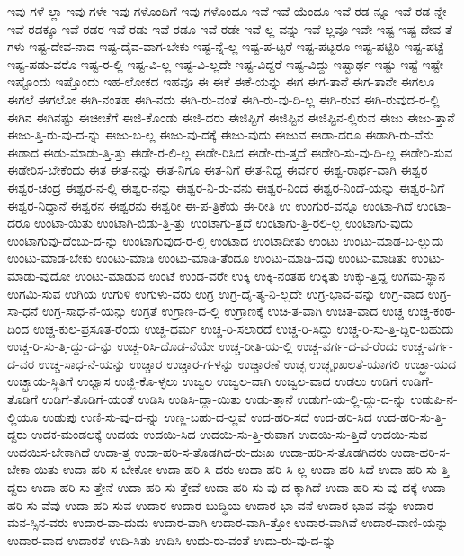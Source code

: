 {ಇವು-ಗಳೆ-ಲ್ಲಾ
ಇವು-ಗಳೇ
ಇವು-ಗಳೊಂದಿಗೆ
ಇವು-ಗಳೊಂದೂ
ಇವೆ
ಇವೆ-ಯೆಂದೂ
ಇವೆ-ರಡ-ನ್ನೂ
ಇವೆ-ರಡ-ನ್ನೇ
ಇವೆ-ರಡಕ್ಕೂ
ಇವೆ-ರಡರ
ಇವೆ-ರಡು
ಇವೆ-ರಡೂ
ಇವೆ-ರಡೇ
ಇವೆ-ಲ್ಲ-ವನ್ನು
ಇವೆ-ಲ್ಲವೂ
ಇವೇ
ಇಷ್ಟ
ಇಷ್ಟ-ದೇವ-ತೆ-ಗಳು
ಇಷ್ಟ-ದೇವ-ನಾದ
ಇಷ್ಟ-ದೈವ-ವಾಗ-ಬೇಕು
ಇಷ್ಟ-ನ್ನೆ-ಲ್ಲ
ಇಷ್ಟ-ಪ-ಟ್ಟರೆ
ಇಷ್ಟ-ಪಟ್ಟರೂ
ಇಷ್ಟ-ಪಟ್ಟಿರಿ
ಇಷ್ಟ-ಪಟ್ಟೆ
ಇಷ್ಟ-ಪಡು-ವರೊ
ಇಷ್ಟ-ರ-ಲ್ಲಿ
ಇಷ್ಟ-ವಿ-ಲ್ಲ
ಇಷ್ಟ-ವಿ-ಲ್ಲದೇ
ಇಷ್ಟ-ವಿದ್ದರೆ
ಇಷ್ಟ-ವಿದ್ದು
ಇಷ್ಟಾರ್ಥ
ಇಷ್ಟು
ಇಷ್ಟೆ
ಇಷ್ಟೇ
ಇಷ್ಟೊಂದು
ಇಷ್ತೊಂದು
ಇಹ-ಲೋಕದ
ಇಹವೂ
ಈ
ಈಕೆ
ಈಕೆ-ಯನ್ನು
ಈಗ
ಈಗ-ತಾನೆ
ಈಗ-ತಾನೇ
ಈಗಲೂ
ಈಗಲೆ
ಈಗಲೋ
ಈಗಿ-ನಂತಹ
ಈಗಿ-ನದು
ಈಗಿ-ರು-ವಂತೆ
ಈಗಿ-ರು-ವು-ದಿ-ಲ್ಲ
ಈಗಿ-ರುವ
ಈಗಿ-ರುವುದ-ರ-ಲ್ಲಿ
ಈಗಿನ
ಈಗಿನಷ್ಟು
ಈಚೀಚೆಗೆ
ಈಜಿ-ಕೊಂಡು
ಈಜಿ-ದರು
ಈಜಿಪ್ಟಿಗೆ
ಈಜಿಪ್ಟಿನ
ಈಜಿಪ್ಟಿನ-ಲ್ಲಿರುವ
ಈಜು
ಈಜು-ತ್ತಾನೆ
ಈಜು-ತ್ತಿ-ರು-ವು-ದ-ನ್ನು
ಈಜು-ಬ-ಲ್ಲ
ಈಜು-ವು-ದಕ್ಕೆ
ಈಜು-ವುದು
ಈಜುವ
ಈಡಾ-ದರೂ
ಈಡಾಗಿ-ರು-ವೆನು
ಈಡಾದ
ಈಡು-ಮಾಡು-ತ್ತಿ-ತ್ತು
ಈಡೇ-ರ-ಲಿ-ಲ್ಲ
ಈಡೇ-ರಿಸಿದ
ಈಡೇ-ರು-ತ್ತದೆ
ಈಡೇರಿ-ಸು-ವು-ದಿ-ಲ್ಲ
ಈಡೇರಿ-ಸುವ
ಈಡೇರಿಸ-ಬೇಕೆಂದು
ಈತ
ಈತ-ನನ್ನು
ಈತ-ನಿಗೂ
ಈತ-ನಿಗೆ
ಈತ-ನಿದ್ದ
ಈರ್ವರ
ಈಶ್ವ-ರಾರ್ಥ-ವಾಗಿ
ಈಶ್ವರ
ಈಶ್ವರ-ಚಂದ್ರ
ಈಶ್ವರ-ನ-ಲ್ಲಿ
ಈಶ್ವರ-ನನ್ನು
ಈಶ್ವರ-ನಿ-ರು-ವನು
ಈಶ್ವರ-ನಿಂದೆ
ಈಶ್ವರ-ನಿಂದೆ-ಯನ್ನು
ಈಶ್ವರ-ನಿಗೆ
ಈಶ್ವರ-ನಿದ್ದಾನೆ
ಈಶ್ವರನ
ಈಶ್ವರನು
ಈಶ್ವರೀ
ಈ-ಪ-ತ್ರಿಕೆಯ
ಈ-ರೀತಿ
ಉ
ಉಂಗುರ-ವನ್ನೂ
ಉಂಟಾ-ಗಿದೆ
ಉಂಟಾ-ದರೂ
ಉಂಟಾ-ಯಿತು
ಉಂಟಾಗಿ-ಬಿಡು-ತ್ತಿ-ತ್ತು
ಉಂಟಾಗು-ತ್ತದೆ
ಉಂಟಾಗು-ತ್ತಿ-ರಲಿ-ಲ್ಲ
ಉಂಟಾಗು-ವುದು
ಉಂಟಾಗುವು-ದೆಂಬು-ದ-ನ್ನು
ಉಂಟಾಗುವುದ-ರ-ಲ್ಲಿ
ಉಂಟಾದ
ಉಂಟಾದೀತು
ಉಂಟು
ಉಂಟು-ಮಾಡ-ಬ-ಲ್ಲುದು
ಉಂಟು-ಮಾಡ-ಬೇಕು
ಉಂಟು-ಮಾಡಿ
ಉಂಟು-ಮಾಡಿ-ತೆಂದೂ
ಉಂಟು-ಮಾಡಿ-ದವು
ಉಂಟು-ಮಾಡಿತು
ಉಂಟು-ಮಾಡು-ವುದೋ
ಉಂಟು-ಮಾಡುವ
ಉಂಟೆ
ಉಂಡ-ವರೇ
ಉಕ್ಕಿ
ಉಕ್ಕಿ-ನಂತಹ
ಉಕ್ಕಿತು
ಉಕ್ಕು-ತ್ತಿದ್ದ
ಉಗಮ-ಸ್ಥಾನ
ಉಗಮಿ-ಸುವ
ಉಗಿಯ
ಉಗುಳಿ
ಉಗುಳು-ವರು
ಉಗ್ರ
ಉಗ್ರ-ದೈ-ತ್ಯ-ನಿ-ಲ್ಲದೇ
ಉಗ್ರ-ಭಾವ-ವನ್ನು
ಉಗ್ರ-ವಾದ
ಉಗ್ರ-ಸಾ-ಧನೆ
ಉಗ್ರ-ಸಾಧ-ನೆ-ಯನ್ನು
ಉಗ್ರತೆ
ಉಗ್ರಾಣ-ದ-ಲ್ಲಿ
ಉಗ್ರಾಣಕ್ಕೆ
ಉಚಿ-ತ-ವಾಗಿ
ಉಚಿತ-ವಾದ
ಉಚ್ಚ
ಉಚ್ಚ-ಕಂಠ-ದಿಂದ
ಉಚ್ಚ-ಕುಲ-ಪ್ರಸೂತ-ರೆಂದು
ಉಚ್ಚ-ಧರ್ಮ
ಉಚ್ಚ-ರಿ-ಸಲಾರದೆ
ಉಚ್ಚ-ರಿ-ಸಿದ್ದು
ಉಚ್ಚ-ರಿ-ಸು-ತ್ತಿ-ದ್ದಿರ-ಬಹುದು
ಉಚ್ಚ-ರಿ-ಸು-ತ್ತಿ-ದ್ದು-ದ-ನ್ನು
ಉಚ್ಚ-ರಿಸಿ-ದೊಡ-ನೆಯೇ
ಉಚ್ಚ-ರೀತಿ-ಯ-ಲ್ಲಿ
ಉಚ್ಚ-ವರ್ಗ-ದ-ವ-ರೆಂದು
ಉಚ್ಚ-ವರ್ಗ-ದ-ವರ
ಉಚ್ಚ-ಸಾಧ-ನೆ-ಯನ್ನು
ಉಚ್ಚಾರ
ಉಚ್ಚಾರ-ಗ-ಳನ್ನು
ಉಚ್ಚಾರಣೆ
ಉಚ್ಛ
ಉಚ್ಛೃಂಖಲತೆ-ಯಾಗಲಿ
ಉಚ್ಛ್ರಾ-ಯದ
ಉಚ್ಛ್ರಾಯ-ಸ್ಥಿತಿಗೆ
ಉಛ್ವಾಸ
ಉಜ್ಜಿ-ಕೊ-ಳ್ಳಲು
ಉಜ್ವಲ
ಉಜ್ವಲ-ವಾಗಿ
ಉಜ್ವಲ-ವಾದ
ಉಡಲು
ಉಡಿಗೆ
ಉಡಿಗೆ-ತೊಡಿಗೆ
ಉಡಿಗೆ-ತೊಡಿಗೆ-ಯಂತೆ
ಉಡಿಸಿ
ಉಡಿಸಿ-ದ್ದಾ-ಯಿತು
ಉಡು-ತ್ತಾನೆ
ಉಡುಗೆ-ಯ-ಲ್ಲಿ-ದ್ದು-ದ-ನ್ನು
ಉಡುಪಿ-ನ-ಲ್ಲಿಯೂ
ಉಡುಪು
ಉಣಿ-ಸು-ವು-ದ-ನ್ನು
ಉಣ್ಣ-ಬಹು-ದ-ಲ್ಲವೆ
ಉದ-ಹರಿ-ಸದೆ
ಉದ-ಹರಿ-ಸಿದ
ಉದ-ಹರಿ-ಸು-ತ್ತಿ-ದ್ದರು
ಉದಕ-ಮಂಡಲಕ್ಕೆ
ಉದಯ
ಉದಯಿ-ಸಿದ
ಉದಯಿ-ಸು-ತ್ತಿ-ರುವಾಗ
ಉದಯಿ-ಸು-ತ್ತಿದೆ
ಉದಯಿ-ಸುವ
ಉದಯಿಸ-ಬೇಕಾಗಿದೆ
ಉದಾ-ತ್ತ
ಉದಾ-ಹರಿ-ಸ-ತೊಡಗಿದ-ರು-ದುಃಖ
ಉದಾ-ಹರಿ-ಸ-ತೊಡಗಿದರು
ಉದಾ-ಹರಿ-ಸ-ಬೇಕಾ-ಯಿತು
ಉದಾ-ಹರಿ-ಸ-ಬೇಕೋ
ಉದಾ-ಹರಿ-ಸಿ-ದರು
ಉದಾ-ಹರಿ-ಸಿ-ಲ್ಲ
ಉದಾ-ಹರಿ-ಸಿದೆ
ಉದಾ-ಹರಿ-ಸು-ತ್ತಿ-ದ್ದರು
ಉದಾ-ಹರಿ-ಸು-ತ್ತೇನೆ
ಉದಾ-ಹರಿ-ಸು-ತ್ತೇವೆ
ಉದಾ-ಹರಿ-ಸು-ವು-ದ-ಕ್ಕಾಗಿದೆ
ಉದಾ-ಹರಿ-ಸು-ವು-ದಕ್ಕೆ
ಉದಾ-ಹರಿ-ಸು-ವೆವು
ಉದಾ-ಹರಿ-ಸುವ
ಉದಾರ
ಉದಾರ-ಬುದ್ಧಿಯ
ಉದಾರ-ಭಾ-ವನೆ
ಉದಾರ-ಭಾವ-ವನ್ನು
ಉದಾರ-ಮನ-ಸ್ಸಿನ-ವರು
ಉದಾರ-ವಾ-ದುದು
ಉದಾರ-ವಾಗಿ
ಉದಾರ-ವಾಗಿ-ತ್ತೋ
ಉದಾರ-ವಾಗಿವೆ
ಉದಾರ-ವಾಣಿ-ಯನ್ನು
ಉದಾರ-ವಾದ
ಉದಾರತೆ
ಉದಿ-ಸಿತು
ಉದಿಸಿ
ಉದು-ರು-ವಂತೆ
ಉದು-ರು-ವು-ದ-ನ್ನು
}
